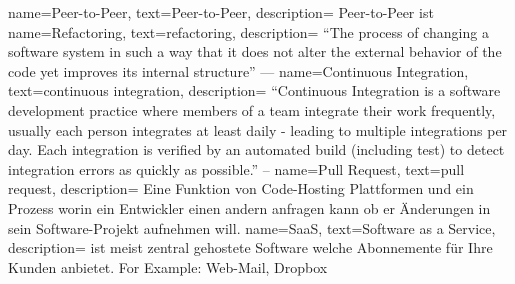 \makeglossaries
                 { name={Peer-to-Peer},                  text={Peer-to-Peer},           description={{
    Peer-to-Peer ist
}}}
         { name={Refactoring},                   text={refactoring},            description={{
    ``The process of changing a software system in such a way that it does
        not alter the external behavior of the code yet improves its internal
        structure'' ---\cite{Fowler2018}
}}}
                  { name={Continuous Integration},        text={continuous integration}, description={{
    ``Continuous Integration is a software development practice where members
    of a team integrate their work frequently,                                 usually each person integrates
    at least daily - leading to multiple integrations per day. Each integration
    is verified by an automated build (including test) to detect integration
    errors as quickly as possible.'' -- \cite{Fowler2014}
}}}
                  { name={Pull Request},                  text={pull request},           description={{
    Eine Funktion von Code-Hosting Plattformen und ein Prozess worin ein Entwickler einen andern anfragen kann ob er Änderungen in sein Software-Projekt aufnehmen will.
}}}
                { name={SaaS},                          text={Software as a Service},  description={{
             ist meist zentral gehostete Software welche Abonnemente für Ihre Kunden anbietet.
    For Example: Web-Mail, Dropbox
}}}


